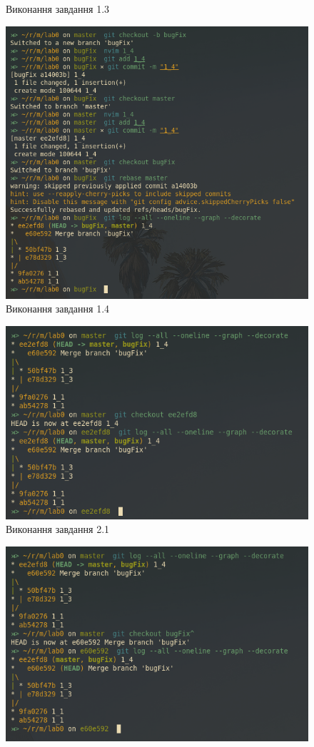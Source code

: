 \documentclass[oneside,14pt]{extarticle}
\begin{document}
\begin{normalsize}
\begin{figure}[H]
			\caption{Виконання завдання 1.3}
		\end{figure}
				\begin{figure}[H]
			\centering
			\includegraphics[scale=0.6]{1_4}
			\caption{Виконання завдання 1.4}
		\end{figure}
				\begin{figure}[H]
			\centering
			\includegraphics[scale=0.6]{2_1}
			\caption{Виконання завдання 2.1}
		\end{figure}
				\begin{figure}[H]
			\centering
			\includegraphics[scale=0.6]{2_2}

\end{figure}
\end{normalsize}
\end{document}

